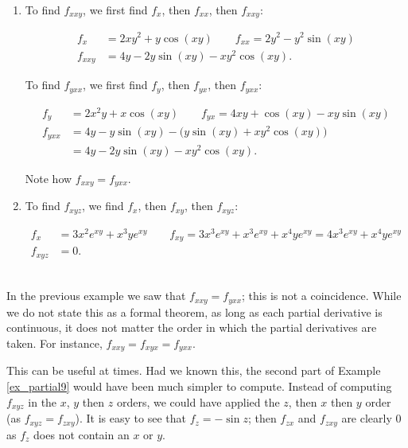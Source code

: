 {\begin{enumerate}
	\item To find $f_{xxy}$, we first find $f_x$, then $f_{xx}$, then $f_{xxy}$:
	
	\begin{align*}
	f_x &= 2xy^2+y\cos(xy) \quad\quad f_{xx} = 2y^2-y^2\sin(xy)\\
	f_{xxy} &= 4y-2y\sin(xy) - xy^2\cos(xy).
	\end{align*}
	
	To find $f_{yxx}$, we first find $f_y$, then $f_{yx}$, then $f_{yxx}$:
	
	\begin{align*}
	f_y &= 2x^2y+x\cos(xy) \quad \quad f_{yx} = 4xy + \cos(xy) - xy\sin(xy)\\
	f_{yxx} &= 4y-y\sin(xy) - \big(y\sin(xy) + xy^2\cos(xy)\big)\\ &= 4y-2y\sin(xy)-xy^2\cos(xy).
	\end{align*}
	
	Note how $f_{xxy} = f_{yxx}$.
	
	\item		To find $f_{xyz}$, we find $f_x$, then $f_{xy}$, then $f_{xyz}$:
	
	\begin{align*}
	f_x &= 3x^2e^{xy}+ x^3ye^{xy} \quad \quad f_{xy} = 3x^3e^{xy}+x^3e^{xy}+x^4ye^{xy} = 4x^3e^{xy}+x^4ye^{xy}\\
	f_{xyz} &= 0.
	\end{align*}
\end{enumerate}
\baselineskip
}\\

In the previous example we saw that $f_{xxy} = f_{yxx}$; this is not a coincidence. While we do not state this as a formal theorem, as long as each partial derivative is continuous, it does not matter the order in which the partial derivatives are taken. For instance, $f_{xxy} = f_{xyx} = f_{yxx}$. 

This can be useful at times. Had we known this, the second part of Example \ref{ex_partial9} would have been much simpler to compute. Instead of computing $f_{xyz}$ in the $x$, $y$ then $z$ orders, we could have applied the $z$, then $x$ then $y$ order (as $f_{xyz} = f_{zxy}$). It is easy to see that $f_z = -\sin z$; then $f_{zx}$ and $f_{zxy}$ are clearly 0 as $f_z$ does not contain an $x$ or $y$.\\

